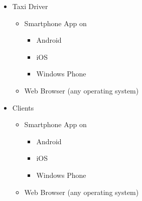 \documentclass[a4paper]{article}
\begin{document}
\begin{itemize}
\item Taxi Driver
    \begin{itemize}
    \item Smartphone App on
        \begin{itemize}
        \item Android
        \item iOS
        \item Windows Phone
        \end{itemize}
    \item Web Browser (any operating system)
    \end{itemize}
\item Clients
    \begin{itemize}
    \item Smartphone App on
        \begin{itemize}
        \item Android
        \item iOS
        \item Windows Phone
        \end{itemize}
    \item Web Browser (any operating system)
    \end{itemize}
\end{itemize}
\end{document}
